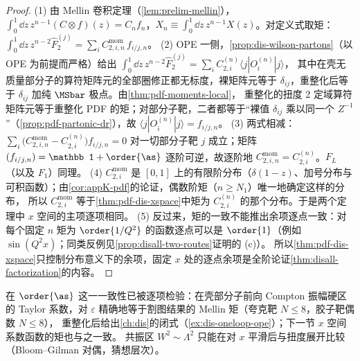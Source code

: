 \begin{proof}
(1) 由 Mellin 卷积定理（\cref{lem:prelim-mellin}），$\int_0^1\dd z\,z^{n-1}(C\otimes f)(z)=C_nf_n$，$X_n\equiv\int_0^1\dd z\,z^{n-1}X(z)$。对定义式取矩：
$\int_0^1\dd z\,z^{n-2}\hat F^{(j)}_2=\sum_iC^{\mathrm{mom}}_{2,i,n}\,f_{i/j,n}$。
(2) OPE 一侧，\cref{prop:dis-wilson-partons}（以 OPE 为前提而严格）给出 $\int_0^1\dd z\,z^{n-2}\hat F^{(j)}_2=\sum_iC^{(n)}_{2,i}\langle j|O^{(n)}_i|j\rangle$，
其中在壳无质量部分子的算符矩阵元的全部圈修正都无标度，裸矩阵元等于 $\delta_{ij}$，重整化后等于 $\delta_{ij}$ 加纯 $\MSbar$ 极点。由\cref{thm:pdf-moments-local}，
重整化的扭度 2 定域算符矩阵元等于重整化 PDF 的矩；对部分子靶，二者都等于“裸值 $\delta_{ij}$ 乘以同一个 $Z^{-1}$”（\cref{prop:pdf-partonic-dr}），故 $\langle j|O^{(n)}_i|j\rangle=f_{i/j,n}$。
(3) 两式相减：$\sum_i\big(C^{\mathrm{mom}}_{2,i,n}-C^{(n)}_{2,i}\big)f_{i/j,n}=0$ 对一切部分子靶 $j$ 成立；矩阵 $(f_{i/j,n})=\mathbb 1+\order{\as}$ 逐阶可逆，故逐阶地 $C^{\mathrm{mom}}_{2,i,n}=C^{(n)}_{2,i}$。$F_L$（以及 $F_1$）同理。
(4) $C^{\mathrm{mom}}_{2,i}$ 是 $[0,1]$ 上的有限阶分布（$\delta(1-z)$、加号分布与可积函数）；由\cref{cor:appK-pdf}的论证，偶数阶矩（$n\ge N_1$）唯一地确定这样的分布，
所以 $C^{\mathrm{mom}}_{2,i}$ 等于\cref{thm:pdf-dis-xspace}中矩为 $C^{(n)}_{2,i}$ 的那个分布。于是两个定理中 $x$ 空间的主项逐项相同。
(5) 反过来，矩的一致不能推出余项逐点一致：对每个固定 $n$ 矩为 $\order{1/Q^2}$ 的函数逐点可以是 $\order{1}$（例如 $\sin(Q^2x)$；同类反例见\cref{prop:disall-two-routes}证明的 (c)）。
所以\cref{thm:pdf-dis-xspace}只控制分布意义下的余项，固定 $x$ 处的逐点余项是全阶论证\cref{thm:disall-factorization}的内容。
\end{proof}

\noindent
在 $\order{\as}$ 这一一致性已被逐项检验：在壳部分子前向 Compton 振幅硬区的 Taylor 系数，对 $\varepsilon$ 精确地等于割图结果的 Mellin 矩（夸克靶 $N\le8$，胶子靶偶数 $N\le8$），
重整化后给出\cref{ch:dis}的闭式（\cref{ex:dis-oneloop-ope}）；下一节 $x$ 空间系数函数的矩也与之一致。   %
共振区 $W^2\sim\Lambda^2$ 只能在对 $x$ 平滑后与扭度展开比较（Bloom--Gilman 对偶，猜想层次）。
